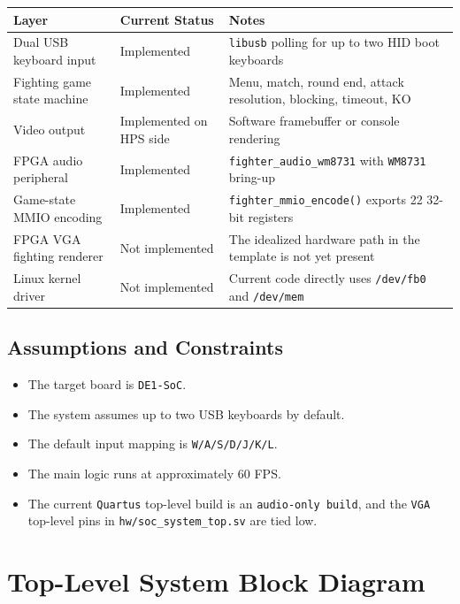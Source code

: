 \documentclass[12pt,a4paper]{article}
\begin{document}
\begin{longtable}{>{\raggedright\arraybackslash}p{} >{\raggedright\arraybackslash}p{} >{\raggedright\arraybackslash}p{}}
\toprule
Layer & Current Status & Notes \\
\midrule
\endhead
Dual USB keyboard input & Implemented & \texttt{libusb} polling for up to two HID boot keyboards \\
Fighting game state machine & Implemented & Menu, match, round end, attack resolution, blocking, timeout, KO \\
Video output & Implemented on HPS side & Software framebuffer or console rendering \\
FPGA audio peripheral & Implemented & \texttt{fighter\_audio\_wm8731} with \texttt{WM8731} bring-up \\
Game-state MMIO encoding & Implemented & \texttt{fighter\_mmio\_encode()} exports 22 32-bit registers \\
FPGA VGA fighting renderer & Not implemented & The idealized hardware path in the template is not yet present \\
Linux kernel driver & Not implemented & Current code directly uses \texttt{/dev/fb0} and \texttt{/dev/mem} \\
\bottomrule
\end{longtable}

\subsection{Assumptions and Constraints}

\begin{itemize}
  \item The target board is \texttt{DE1-SoC}.
  \item The system assumes up to two USB keyboards by default.
  \item The default input mapping is \texttt{W/A/S/D/J/K/L}.
  \item The main logic runs at approximately 60 FPS.
  \item The current \texttt{Quartus} top-level build is an \texttt{audio-only build}, and the \texttt{VGA} top-level pins in \texttt{hw/soc\_system\_top.sv} are tied low.
\end{itemize}

\section{Top-Level System Block Diagram}
\end{document}
